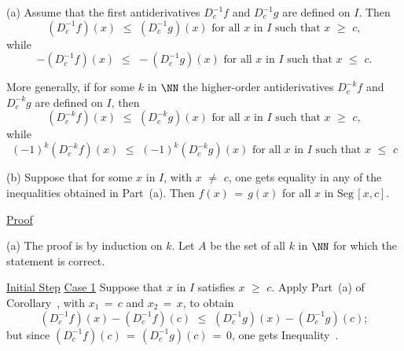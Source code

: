 {\V

        (a) Assume that the first antiderivatives $D^{-1}_{c} f$ and $D^{-1}_{c} g$ are defined on $I$.
    Then
        \begin{equation}
        \label{IneqE.87A}
        \left(D^{-1}_{c} f\right)(x)\,\,{\leq}\,\,\left(D^{-1}_{c} g\right)(x)
    \mbox{ for all $x$ in $I$ such that $x\,\,{\geq}\,\,c$},
        \end{equation}
    while
        \begin{equation}
        \label{IneqE.87B}
        -\left(D^{-1}_{c} f\right)(x)\,\,{\leq}\,\,-\left(D^{-1}_{c} g\right)(x)
    \mbox{ for all $x$ in $I$ such that $x\,\,{\leq}\,\,c$}.
        \end{equation}

        More generally, if for some $k$ in ${\NN}$ the higher-order antiderivatives  $D^{-k}_{c} f$ and $D^{-k}_{c} g$ are defined on $I$, then
            \begin{equation}
        \label{IneqE.88A}
        \left(D^{-k}_{c} f\right)(x)\,\,{\leq}\,\,\left(D^{-k}_{c} g\right)(x)
    \mbox{ for all $x$ in $I$ such that $x\,\,{\geq}\,\,c$},
        \end{equation}
    while
        \begin{equation}
        \label{IneqE.88B}
        (-1)^{k}\left(D^{-k}_{c} f\right)(x)\,\,{\leq}\,\,(-1)^{k}\left(D^{-k}_{c} g\right)(x)
    \mbox{ for all $x$ in $I$ such that $x\,\,{\leq}\,\,c$}
        \end{equation}

\V

        (b) Suppose that for some $x$ in $I$, with $x \,\,{\neq}\,\, c$, one gets equality in any of the inequalities obtained in Part~(a).
    Then $f(x) \,=\, g(x)$ for all $x$ in $\mbox{Seg}\,[x,c]$.

\V

        \underline{Proof} 

        (a) The proof is by induction on $k$. Let $A$ be the set of all $k$ in ${\NN}$ for which the statement is correct.

        \underline{Initial Step} \underline{Case 1} Suppose that $x$ in $I$ satisfies $x\,\,{\geq}\,\,c$. Apply Part~(a) of Corollary~, with $x_{1} \,=\, c$ and $x_{2} \,=\, x$, to obtain
        \begin{displaymath}
        \left(D^{-1}_{c} f\right)(x) - \left(D^{-1}_{c} f\right)(c)\,\,{\leq}\,\,
    \left(D^{-1}_{c} g\right)(x) - \left(D^{-1}_{c} g\right)(c);
        \end{displaymath}
    but since $\left(D^{-1}_{c} f\right)(c) \,=\, \left(D^{-1}_{c} g\right)(c) \,=\, 0$,
    one gets Inequality~.

}

